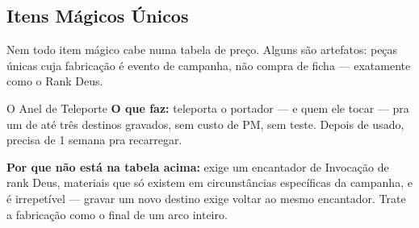\subsection{Itens Mágicos Únicos}

Nem todo item mágico cabe numa tabela de preço. Alguns são artefatos: peças únicas cuja
fabricação é evento de campanha, não compra de ficha --- exatamente como o Rank Deus.

\begin{exemplo}{O Anel de Teleporte}
    \textbf{O que faz:} teleporta o portador --- e quem ele tocar --- pra um de até três
    destinos gravados, sem custo de PM, sem teste. Depois de usado, precisa de 1 semana pra
    recarregar.

    \medskip
    \textbf{Por que não está na tabela acima:} exige um encantador de Invocação de rank Deus,
    materiais que só existem em circunstâncias específicas da campanha, e é irrepetível ---
    gravar um novo destino exige voltar ao mesmo encantador. Trate a fabricação como o final
    de um arco inteiro.
\end{exemplo}
